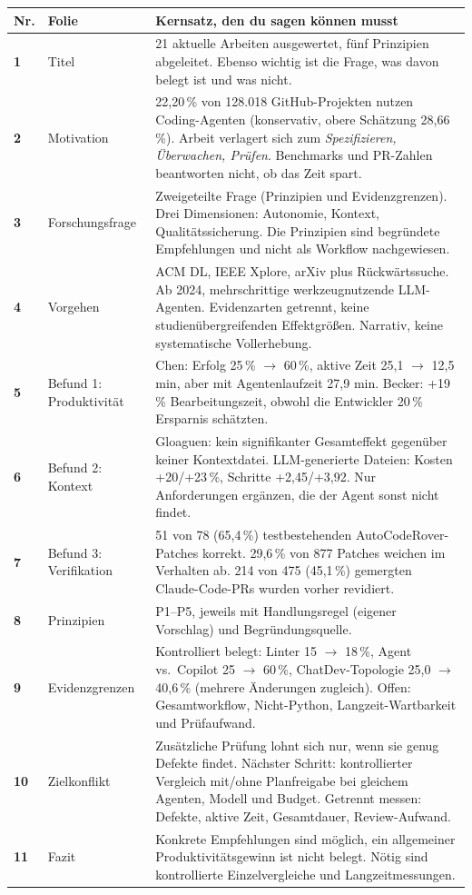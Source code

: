 \documentclass[12pt,a4paper]{article}
\begin{document}
\begin{longtable}{@{}>{\bfseries}p{1.0cm}p{3.6cm}p{11.3cm}@{}}
\toprule
Nr. & Folie & Kernsatz, den du sagen können musst \\
\midrule
\endhead
1 & Titel & 21 aktuelle Arbeiten ausgewertet, fünf Prinzipien abgeleitet. Ebenso wichtig ist die Frage, was davon belegt ist und was nicht. \\
2 & Motivation & 22,20\,\% von 128.018 GitHub-Projekten nutzen Coding-Agenten (konservativ, obere Schätzung 28,66\,\%). Arbeit verlagert sich zum \emph{Spezifizieren, Überwachen, Prüfen}. Benchmarks und PR-Zahlen beantworten nicht, ob das Zeit spart. \\
3 & Forschungsfrage & Zweigeteilte Frage (Prinzipien und Evidenzgrenzen). Drei Dimensionen: Autonomie, Kontext, Qualitätssicherung. Die Prinzipien sind begründete Empfehlungen und nicht als Workflow nachgewiesen. \\
4 & Vorgehen & ACM DL, IEEE Xplore, arXiv plus Rückwärtssuche. Ab 2024, mehrschrittige werkzeugnutzende LLM-Agenten. Evidenzarten getrennt, keine studienübergreifenden Effektgrößen. Narrativ, keine systematische Vollerhebung. \\
5 & Befund 1: Produktivität & Chen: Erfolg 25\,\% $\to$ 60\,\%, aktive Zeit 25,1 $\to$ 12,5 min, aber mit Agentenlaufzeit 27,9 min. Becker: +19\,\% Bearbeitungszeit, obwohl die Entwickler 20\,\% Ersparnis schätzten. \\
6 & Befund 2: Kontext & Gloaguen: kein signifikanter Gesamteffekt gegenüber keiner Kontextdatei. LLM-generierte Dateien: Kosten +20/+23\,\%, Schritte +2,45/+3,92. Nur Anforderungen ergänzen, die der Agent sonst nicht findet. \\
7 & Befund 3: Verifikation & 51 von 78 (65,4\,\%) testbestehenden AutoCodeRover-Patches korrekt. 29,6\,\% von 877 Patches weichen im Verhalten ab. 214 von 475 (45,1\,\%) gemergten Claude-Code-PRs wurden vorher revidiert. \\
8 & Prinzipien & P1--P5, jeweils mit Handlungsregel (eigener Vorschlag) und Begründungsquelle. \\
9 & Evidenzgrenzen & Kontrolliert belegt: Linter 15 $\to$ 18\,\%, Agent vs.\ Copilot 25 $\to$ 60\,\%, ChatDev-Topologie 25,0 $\to$ 40,6\,\% (mehrere Änderungen zugleich). Offen: Gesamtworkflow, Nicht-Python, Langzeit-Wartbarkeit und Prüfaufwand. \\
10 & Zielkonflikt & Zusätzliche Prüfung lohnt sich nur, wenn sie genug Defekte findet. Nächster Schritt: kontrollierter Vergleich mit/ohne Planfreigabe bei gleichem Agenten, Modell und Budget. Getrennt messen: Defekte, aktive Zeit, Gesamtdauer, Review-Aufwand. \\
11 & Fazit & Konkrete Empfehlungen sind möglich, ein allgemeiner Produktivitätsgewinn ist nicht belegt. Nötig sind kontrollierte Einzelvergleiche und Langzeitmessungen. \\
\bottomrule
\end{longtable}
\end{document}
